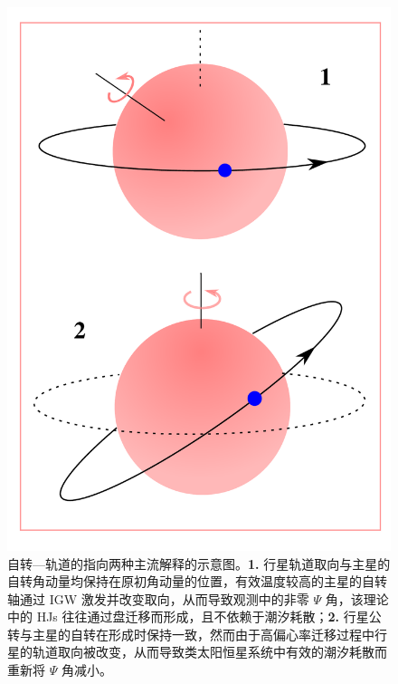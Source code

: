 \begin{figure}[t!]
\centering
\includegraphics[height=0.85\textheight]{figures/chapter4/fig11_som2th.pdf}
\caption{自转---轨道的指向两种主流解释的示意图。\textbf{1.} 行星轨道取向与主星的自转角动量均保持在原初角动量的位置，有效温度较高的主星的自转轴通过 IGW 激发并改变取向，从而导致观测中的非零 $\Psi$ 角，该理论中的 HJs 往往通过盘迁移而形成，且不依赖于潮汐耗散；\textbf{2.} 行星公转与主星的自转在形成时保持一致，然而由于高偏心率迁移过程中行星的轨道取向被改变，从而导致类太阳恒星系统中有效的潮汐耗散而重新将 $\Psi$ 角减小。}
\label{fig:som2th}
\end{figure}


